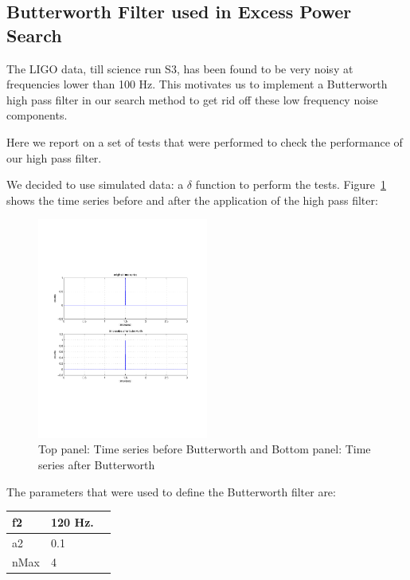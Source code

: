\clearpage

\subsection{Butterworth Filter used in Excess Power Search}

The LIGO data, till science run S3, has been found to be very noisy 
at frequencies lower than 100 Hz. This motivates us to implement a 
Butterworth high pass filter in our search method to get rid off these 
low frequency noise components. 

Here we report on a set of tests that were performed to check the
performance of our high pass filter.

We decided to use simulated data: a $\delta$ function to perform the 
tests. Figure~\ref{fig:checkbuttertimeseries} shows the time series before 
and after the application of the high pass filter:
\begin{figure}[h]
\begin{center}
\includegraphics[width=0.5\textwidth]{figures/checkbuttertimeseries}
\caption{ Top panel: Time series before Butterworth and 
Bottom panel: Time series after Butterworth} \label{fig:checkbuttertimeseries}
\end{center}
\end{figure}

The parameters that were used to define the Butterworth filter are:

\begin{tabular}{|l|l|r|} \hline
  f2  & 120 Hz. \\ \hline
  a2  & 0.1     \\ \hline
  nMax  & 4     \\ \hline
\end{tabular} \label{tab:butter}

